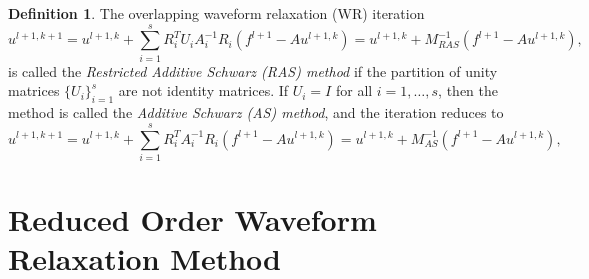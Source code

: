 \documentclass[a4paper, 11pt]{article}
\theoremstyle{plain}
\theoremstyle{definition}
\newtheorem{definition}[equation]{Definition}
\theoremstyle{remark}
\begin{document}
\begin{definition}
    The overlapping waveform relaxation (WR) iteration
    \begin{equation*}
        u^{l+1, k+1} = u^{l+1, k} + \sum_{i=1}^{s}R_{i}^{T}U_{i}A_{i}^{-1}R_{i}\left(f^{l+1} - Au^{l+1, k}\right) = u^{l+1, k} + M_{RAS}^{-1}\left(f^{l+1} - Au^{l+1, k}\right),
    \end{equation*}
    is called the \textit{Restricted Additive Schwarz (RAS) method} if the partition of unity matrices $\{U_{i}\}_{i=1}^{s}$ are not identity matrices. If $U_{i} = I$ for all $i = 1, \ldots, s$, then the method is called the \textit{Additive Schwarz (AS) method}, and the iteration reduces to
    \begin{equation*}
        u^{l+1, k+1} = u^{l+1, k} + \sum_{i=1}^{s}R_{i}^{T}A_{i}^{-1}R_{i}\left(f^{l+1} - Au^{l+1, k}\right) = u^{l+1, k} + M_{AS}^{-1}\left(f^{l+1} - Au^{l+1, k}\right),
    \end{equation*}
\end{definition}

\section{Reduced Order Waveform Relaxation Method}
\end{document}
